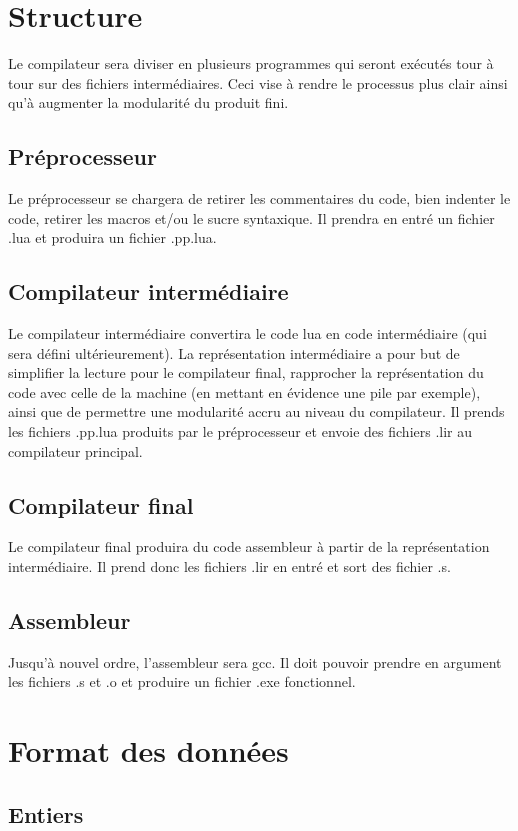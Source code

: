 \documentclass{article}
\begin{document}
\section{Structure}
Le compilateur sera diviser en plusieurs programmes qui seront exécutés tour à tour sur des fichiers intermédiaires. Ceci vise à rendre le processus plus clair ainsi qu'à augmenter la modularité du produit fini.

\subsection{Préprocesseur}
Le préprocesseur se chargera de retirer les commentaires du code, bien indenter le code, retirer les macros et/ou le sucre syntaxique. Il prendra en entré un fichier .lua et produira un fichier .pp.lua.

\subsection{Compilateur intermédiaire}
Le compilateur intermédiaire convertira le code lua en code intermédiaire (qui sera défini ultérieurement). La représentation intermédiaire a pour but de simplifier la lecture pour le compilateur final, rapprocher la représentation du code avec celle de la machine (en mettant en évidence une pile par exemple), ainsi que de permettre une modularité accru au niveau du compilateur. Il prends les fichiers .pp.lua produits par le préprocesseur et envoie des fichiers .lir au compilateur principal.

\subsection{Compilateur final}
Le compilateur final produira du code assembleur à partir de la représentation intermédiaire. Il prend donc les fichiers .lir en entré et sort des fichier .s.

\subsection{Assembleur}
Jusqu'à nouvel ordre, l'assembleur sera gcc. Il doit pouvoir prendre en argument les fichiers .s et .o et produire un fichier .exe fonctionnel.

\section{Format des données}
\subsection{Entiers}
\end{document}
